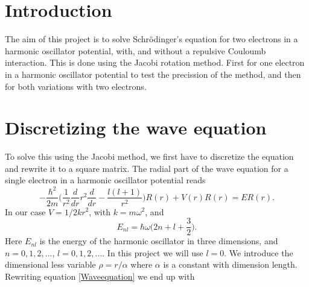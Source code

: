 \documentclass{aa}   %
\begin{document}
  



\section{Introduction}   \label{sec:Intro}
The aim of this project is to solve Schrödinger's equation for two electrons in a harmonic oscillator potential, with, and without a repulsive Couloumb interaction. This is done using the Jacobi rotation method. First for one electron in a harmonic oscillator potential to test the precission of the method, and then for both variations with two electrons.
\section{Discretizing the wave equation}    \label{sec:Discretizing}
To solve this using the Jacobi method, we first have to discretize the equation and rewrite it to a square matrix.
The radial part of the wave equation for a single electron in a harmonic oscillator potential reads
\begin{equation}
 -\frac{\hbar^2}{2m}\bigg(\frac{1}{r^2}\frac{d}{dr}r^2\frac{d}{dr} - \frac{l(l+1)}{r^2}\bigg)R(r) + V(r)R(r) = ER(r).
\end{equation}\label{Waveequation}
In our case $V = 1/2 kr^2$, with $k = m\omega^2$, and 
\begin{equation}
E_{nl} = \hbar\omega \bigg(2n + l +\frac{3}{2}\bigg).
\end{equation}\label{Energy}
Here $E_{nl}$ is the energy of the harmonic oscillator in three dimensions, and $n = 0,1,2,...$, $l = 0,1,2,...$. In this project we will use $l = 0$. We introduce the dimensional less variable $\rho = r/\alpha$ where $\alpha$ is a constant with dimension length. Rewriting equation \ref{Waveequation} we end up with
\end{document}
